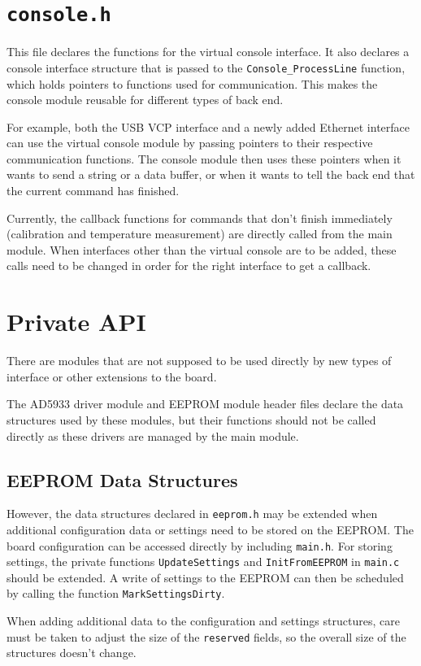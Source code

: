 \section{\texttt{console.h}}

This file declares the functions for the virtual console interface. It also declares a console interface structure
that is passed to the \verb!Console_ProcessLine! function, which holds pointers to functions used for communication.
This makes the console module reusable for different types of back end.

For example, both the USB VCP interface and a newly added Ethernet interface can use the virtual console module by
passing pointers to their respective communication functions. The console module then uses these pointers when it wants
to send a string or a data buffer, or when it wants to tell the back end that the current command has finished.

Currently, the callback functions for commands that don't finish immediately (calibration and temperature measurement)
are directly called from the main module. When interfaces other than the virtual console are to be added, these
calls need to be changed in order for the right interface to get a callback.


\section{Private API}

There are modules that are not supposed to be used directly by new types of interface or other extensions to the board.

The AD5933 driver module and EEPROM module header files declare the data structures used by these modules, but their
functions should not be called directly as these drivers are managed by the main module.

\subsection{EEPROM Data Structures}

However, the data structures declared in \verb!eeprom.h! may be extended when additional configuration data or settings
need to be stored on the EEPROM. The board configuration can be accessed directly by including \verb!main.h!.
For storing settings, the private functions \verb!UpdateSettings! and \verb!InitFromEEPROM! in \verb!main.c! should
be extended. A write of settings to the EEPROM can then be scheduled by calling the function \verb!MarkSettingsDirty!.

When adding additional data to the configuration and settings structures, care must be taken to adjust the size of the
\verb!reserved! fields, so the overall size of the structures doesn't change.

